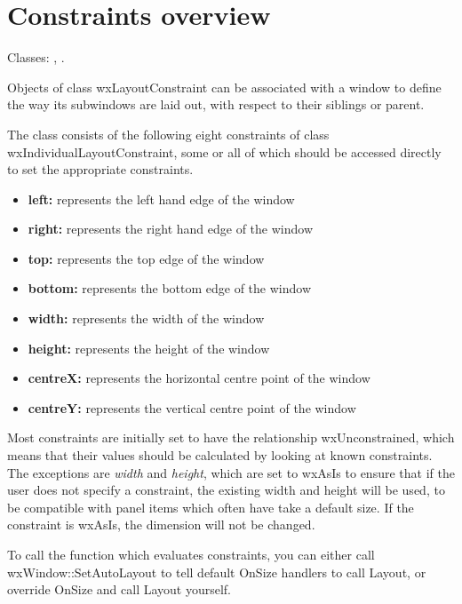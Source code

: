 \section{Constraints overview}\label{constraintsoverview}

Classes: , .

Objects of class wxLayoutConstraint can be associated with a window to define the
way its subwindows are laid out, with respect to their siblings or parent.

The class consists of the following eight constraints of class wxIndividualLayoutConstraint,
some or all of which should be accessed directly to set the appropriate
constraints.

\begin{itemize}\itemsep=0pt
\item {\bf left:} represents the left hand edge of the window
\item {\bf right:} represents the right hand edge of the window
\item {\bf top:} represents the top edge of the window
\item {\bf bottom:} represents the bottom edge of the window
\item {\bf width:} represents the width of the window
\item {\bf height:} represents the height of the window
\item {\bf centreX:} represents the horizontal centre point of the window
\item {\bf centreY:} represents the vertical centre point of the window
\end{itemize}

Most constraints are initially set to have the relationship wxUnconstrained,
which means that their values should be calculated by looking at known constraints.
The exceptions are {\it width} and {\it height}, which are set to wxAsIs to
ensure that if the user does not specify a constraint, the existing
width and height will be used, to be compatible with panel items which often
have take a default size. If the constraint is wxAsIs, the dimension will
not be changed.

To call the  function which evaluates
constraints, you can either call wxWindow::SetAutoLayout to tell
default OnSize handlers to call Layout, or override OnSize and call Layout yourself.

